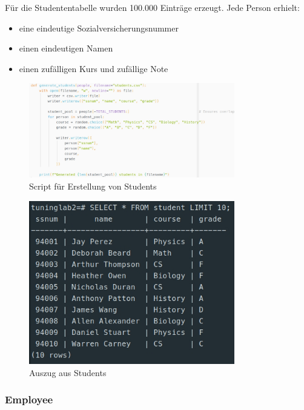 \documentclass[11pt]{scrartcl}
\begin{document}
Für die Studententabelle wurden 100.000 Einträge erzeugt. Jede Person erhielt:

\begin{itemize}
    \item eine eindeutige Sozialversicherungsnummer
    \item einen eindeutigen Namen
    \item einen zufälligen Kurs und zufällige Note
\end{itemize}

\begin{figure}[htbp]
    \centering
    \includegraphics[width=0.8\textwidth]{Pics/StudentsScript.jpg}
    \caption{Script für Erstellung von Students}
    \label{fig:ScriptStudents}
\end{figure}

\begin{figure}[htbp]
    \centering
    \includegraphics[width=0.8\textwidth]{Pics/StudentsResult.jpg}
    \caption{Auszug aus Students}
    \label{fig:StudentsResult}
\end{figure}

\subsubsection*{Employee}
\end{document}

